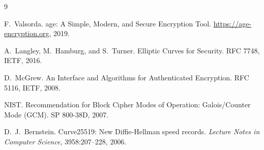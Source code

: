 \documentclass[11pt,a4paper]{article}
\begin{document}

\begin{thebibliography}{9}

F.~Valsorda. age: A Simple, Modern, and Secure Encryption Tool. \url{https://age-encryption.org}, 2019.

A.~Langley, M.~Hamburg, and S.~Turner. Elliptic Curves for Security. RFC 7748, IETF, 2016.

D.~McGrew. An Interface and Algorithms for Authenticated Encryption. RFC 5116, IETF, 2008.

NIST. Recommendation for Block Cipher Modes of Operation: Galois/Counter Mode (GCM). SP 800-38D, 2007.

D.~J.~Bernstein. Curve25519: New Diffie-Hellman speed records. \textit{Lecture Notes in Computer Science}, 3958:207--228, 2006.

\end{thebibliography}
\end{document}

